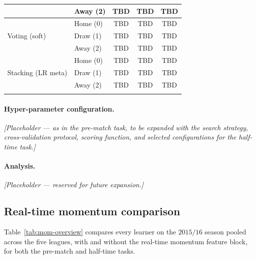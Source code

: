 \documentclass[pdflatex,sn-mathphys-num]{sn-jnl}
\theoremstyle{thmstyleone}
\theoremstyle{thmstyletwo}
\theoremstyle{thmstylethree}
\begin{document}
\begin{table}[h]
\begin{tabular*}{\textwidth}{@{\extracolsep\fill}llccc@{}}
                                     & Away (2) & TBD & TBD & TBD \\
\midrule
\multirow{3}{*}{Voting (soft)}       & Home (0) & TBD & TBD & TBD \\
                                     & Draw (1) & TBD & TBD & TBD \\
                                     & Away (2) & TBD & TBD & TBD \\
\midrule
\multirow{3}{*}{Stacking (LR meta)}  & Home (0) & TBD & TBD & TBD \\
                                     & Draw (1) & TBD & TBD & TBD \\
                                     & Away (2) & TBD & TBD & TBD \\
\botrule
\end{tabular*}
\end{table}

\paragraph{Hyper-parameter configuration.}
\emph{[Placeholder --- as in the pre-match task, to be expanded with
the search strategy, cross-validation protocol, scoring function,
and selected configurations for the half-time task.]}

\paragraph{Analysis.}
\emph{[Placeholder --- reserved for future expansion.]}

\subsection{Real-time momentum comparison}\label{subsec:res-mom}

Table~\ref{tab:mom-overview} compares every learner on the
$2015/16$ season pooled across the five leagues, with and without
the real-time momentum feature block, for both the pre-match and
half-time tasks.
\end{document}
